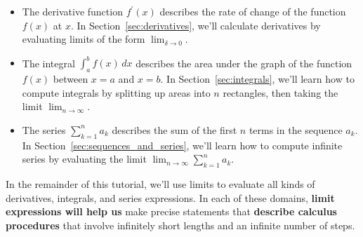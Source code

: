 		\begin{itemize}

			\item The derivative function $f^{\prime\!}(x)$
				describes the rate of change of the function $f(x)$ at $x$.
				In Section~\ref{sec:derivatives},
				we'll calculate derivatives by evaluating limits of the form $\lim_{\delta \to 0}$.

			\item The integral $\int_a^b f(x) \, dx$
				describes the area under the graph of the function $f(x)$ between $x=a$ and $x=b$.
				In Section~\ref{sec:integrals},
				we'll learn how to compute integrals by splitting up areas into $n$ rectangles,
				then taking the limit $\lim_{n \to \infty}$.

			\item The series $\sum_{k=1}^n a_k$ describes
				the sum of the first $n$ terms in the sequence $a_k$.
				In Section~\ref{sec:sequences_and_series},
				we'll learn how to compute infinite series by evaluating the limit
				$\lim_{n \to \infty}\sum_{k=1}^n a_k$.

		\end{itemize}

		\noindent
		In the remainder of this tutorial,
		we'll use limits to evaluate all kinds of derivatives, integrals, and series expressions.
		In each of these domains,
		\textbf{limit expressions will help us} make precise statements
		that \textbf{describe calculus procedures} that involve infinitely short lengths
		and an infinite number of steps.









%
%



